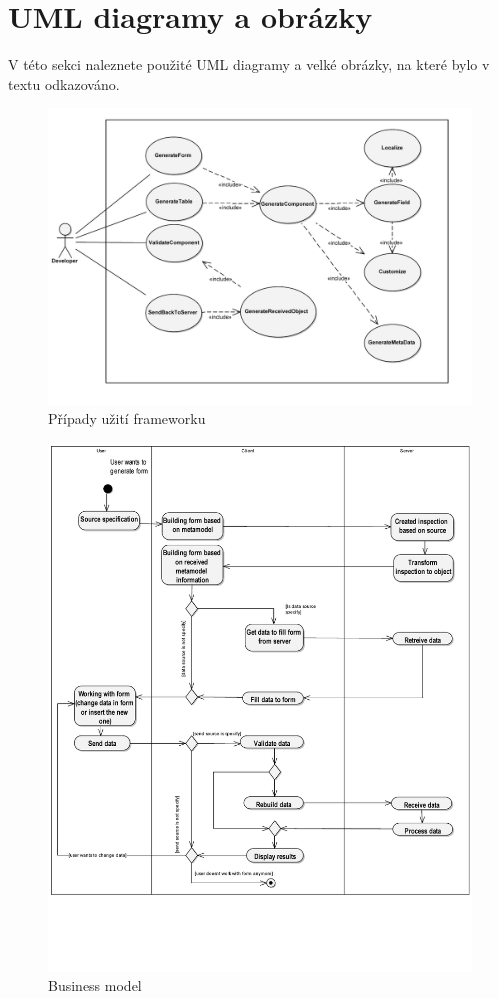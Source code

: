 \documentclass[11pt,twoside,a4paper]{book}
\begin{document}
\chapter{UML diagramy a obrázky}
V této sekci naleznete použité UML diagramy a velké obrázky, na které bylo v textu odkazováno.
\begin{figure}
\begin{center}
\includegraphics[angle=270]{images/useCase}
\caption{Případy užití frameworku}
\label{img:useCase}
\end{center}
\end{figure}

\begin{figure}
\includegraphics{images/businessModel}
\caption{Business model}
\label{img:businessModel}
\end{figure}
\end{document}
